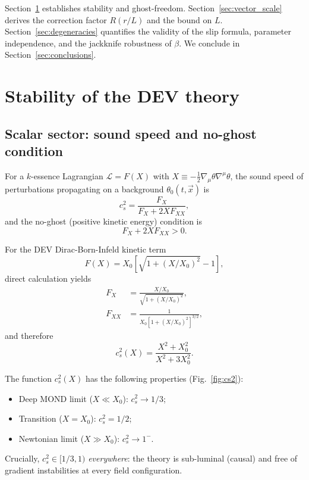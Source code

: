 \documentclass[aps,prd,reprint,floatfix,nofootinbib,superscriptaddress]{revtex4-2}
\newcommand{\Xzero}{X_0}
\newcommand{\cs}{c_s}
\begin{document}
Section~\ref{sec:stability} establishes stability and ghost-freedom.
Section~\ref{sec:vector_scale} derives the correction factor
$R(r/L)$ and the bound on $L$.
Section~\ref{sec:degeneracies} quantifies the validity of the slip
formula, parameter independence, and the jackknife robustness of
$\beta$. We conclude in Section~\ref{sec:conclusions}.

\section{Stability of the DEV theory}
\label{sec:stability}

\subsection{Scalar sector: sound speed and no-ghost condition}

For a $k$-essence Lagrangian $\mathcal{L} = F(X)$ with
$X \equiv -\frac{1}{2}\nabla_\mu\theta\nabla^\mu\theta$, the sound
speed of perturbations propagating on a background $\theta_0(t,\vec{x})$
is~\cite{ArmendarizPicon1999}
\begin{equation}
  \cs^2 = \frac{F_X}{F_X + 2X F_{XX}},
  \label{eq:cs_general}
\end{equation}
and the no-ghost (positive kinetic energy) condition is
\begin{equation}
  F_X + 2X F_{XX} > 0.
  \label{eq:noghost_general}
\end{equation}

For the DEV Dirac-Born-Infeld kinetic term
\begin{equation}
  F(X) = \Xzero\!\left[\sqrt{1 + (X/\Xzero)^2} - 1\right],
\end{equation}
direct calculation yields
\begin{align}
  F_X &= \frac{X/\Xzero}{\sqrt{1+(X/\Xzero)^2}}, \\
  F_{XX} &= \frac{1}{\Xzero[1+(X/\Xzero)^2]^{3/2}},
\end{align}
and therefore
\begin{equation}
  \boxed{\cs^2(X) = \frac{X^2 + \Xzero^2}{X^2 + 3\Xzero^2}.}
  \label{eq:cs_DBI}
\end{equation}

The function $\cs^2(X)$ has the following properties (Fig.~\ref{fig:cs2}):
\begin{itemize}
  \item Deep MOND limit ($X\ll\Xzero$): $\cs^2 \to 1/3$;
  \item Transition ($X = \Xzero$): $\cs^2 = 1/2$;
  \item Newtonian limit ($X\gg\Xzero$): $\cs^2 \to 1^-$.
\end{itemize}
Crucially, $\cs^2 \in [1/3,1)$ \emph{everywhere}: the theory is
sub-luminal (causal) and free of gradient instabilities at every
field configuration.
\end{document}
